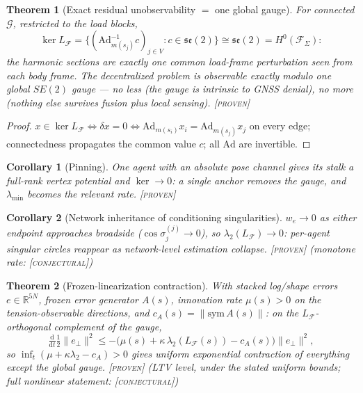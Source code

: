 \documentclass[letterpaper, 10pt, journal]{IEEEtran}
\newtheorem{theorem}{Theorem}\newtheorem{lemma}{Lemma}
\newtheorem{corollary}{Corollary}\newtheorem{definition}{Definition}
\newcommand{\provtag}{\textsc{[proven]}}
\newcommand{\conjtag}{\textsc{[conjectural]}}
\begin{document}
\begin{theorem}[Exact residual unobservability $=$ one global gauge]
\label{thm:gaugeF}
For connected $\mathcal{G}$, restricted to the load blocks,
\[
\ker L_{\mathcal{F}} = \bigl\{ (\mathrm{Ad}^{-1}_{m(s_j)} c)_{j \in V} : c \in
\mathfrak{se}(2) \bigr\} \cong \mathfrak{se}(2) = H^0(\mathcal{F}_\Sigma):
\]
the harmonic sections are exactly one common load-frame perturbation seen from
each body frame. The decentralized problem is observable \emph{exactly modulo
one global $SE(2)$ gauge} --- no less (the gauge is intrinsic to GNSS denial),
no more (nothing else survives fusion plus local sensing). \provtag
\end{theorem}
\begin{proof}
$x \in \ker L_\mathcal{F} \iff \delta x = 0 \iff \mathrm{Ad}_{m(s_i)} x_i =
\mathrm{Ad}_{m(s_j)} x_j$ on every edge; connectedness propagates the common
value $c$; all $\mathrm{Ad}$ are invertible.
\end{proof}

\begin{corollary}[Pinning]\label{cor:pinF}
One agent with an absolute pose channel gives its stalk a full-rank vertex
potential and $\ker \to 0$: a single anchor removes the gauge, and
$\lambda_{\min}$ becomes the relevant rate. \provtag
\end{corollary}

\begin{corollary}[Network inheritance of conditioning singularities]
\label{cor:inheritF}
$w_e \to 0$ as either endpoint approaches broadside
($\cos\sigma^{(j)}_j \to 0$), so $\lambda_2(L_\mathcal{F}) \to 0$: per-agent
singular circles reappear as network-level estimation collapse. \provtag{}
(monotone rate: \conjtag)
\end{corollary}

\begin{theorem}[Frozen-linearization contraction]\label{thm:contractF}
With stacked log/shape errors $e \in \mathbb{R}^{5N}$, frozen error generator
$A(s)$, innovation rate $\mu(s) > 0$ on the tension-observable directions, and
$c_A(s) = \|\mathrm{sym}\, A(s)\|$: on the $L_\mathcal{F}$-orthogonal
complement of the gauge,
\[
\tfrac{\mathrm{d}}{\mathrm{d}t} \tfrac{1}{2}\|e_\perp\|^2 \le
-\bigl(\mu(s) + \kappa\,\lambda_2(L_\mathcal{F}(s)) - c_A(s)\bigr)
\|e_\perp\|^2,
\]
so $\inf_t(\mu + \kappa\lambda_2 - c_A) > 0$ gives uniform exponential
contraction of everything except the global gauge. \provtag{} (LTV level,
under the stated uniform bounds; full nonlinear statement: \conjtag)
\end{theorem}
\end{document}
